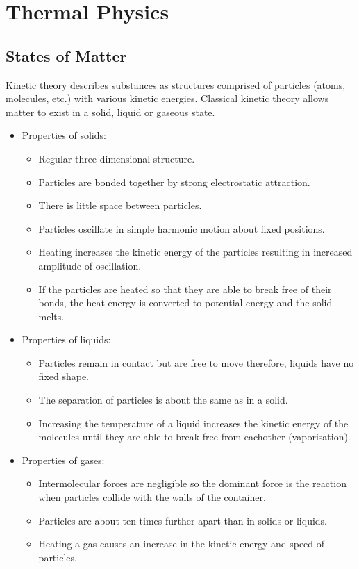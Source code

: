 \documentclass[a4,8pt]{article}
\begin{document}
\section{Thermal Physics}
\subsection{States of Matter}
Kinetic theory describes substances as structures comprised of particles (atoms, molecules, etc.) with various kinetic energies. Classical kinetic theory allows matter to exist in a solid, liquid or gaseous state.

\begin{itemize}
	\item Properties of solids:
		\begin{itemize}
			\item Regular three-dimensional structure.
			\item Particles are bonded together by strong electrostatic attraction.
			\item There is little space between particles.
			\item Particles oscillate in simple harmonic motion about fixed positions.
			\item Heating increases the kinetic energy of the particles resulting in increased amplitude of oscillation.
			\item If the particles are heated so that they are able to break free of their bonds, the heat energy is converted to potential energy and the solid melts.
		\end{itemize}
	\item Properties of liquids:
		\begin{itemize}
			\item Particles remain in contact but are free to move therefore, liquids have no fixed shape.
			\item The separation of particles is about the same as in a solid.
			\item Increasing the temperature of a liquid increases the kinetic energy of the molecules until they are able to break free from eachother (vaporisation).
		\end{itemize}
	\item Properties of gases:
		\begin{itemize}
			\item Intermolecular forces are negligible so the dominant force is the reaction when particles collide with the walls of the container.
			\item Particles are about ten times further apart than in solids or liquids.
			\item Heating a gas causes an increase in the kinetic energy and speed of particles.
		\end{itemize}
\end{itemize}
\end{document}
